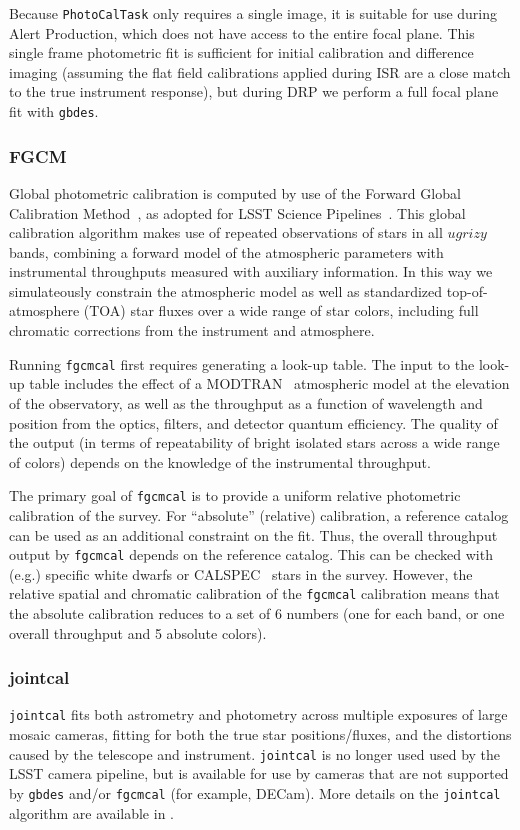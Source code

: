 Because \texttt{PhotoCalTask} only requires a single image, it is suitable for use during Alert Production, which does not have access to the entire focal plane.
This single frame photometric fit is sufficient for initial calibration and difference imaging (assuming the flat field calibrations applied during ISR are a close match to the true instrument response), but during DRP we perform a full focal plane fit with \texttt{gbdes}.

\subsubsection{FGCM}
\label{sec:fgcmcal}

Global photometric calibration is computed by use of the Forward Global Calibration Method~\citep[FGCM][]{2018AJ....155...41B}, as adopted for LSST Science Pipelines~\citep{SITCOMTN-086}.
This global calibration algorithm makes use of repeated observations of stars in all $ugrizy$ bands, combining a forward model of the atmospheric parameters with instrumental throughputs measured with auxiliary information.
In this way we simulateously constrain the atmospheric model as well as standardized top-of-atmosphere (TOA) star fluxes over a wide range of star colors, including full chromatic corrections from the instrument and atmosphere.

Running \texttt{fgcmcal} first requires generating a look-up table.
The input to the look-up table includes the effect of a MODTRAN~\citep{10.1117/12.366388} atmospheric model at the elevation of the observatory, as well as the throughput as a function of wavelength and position from the optics, filters, and detector quantum efficiency.
The quality of the output (in terms of repeatability of bright isolated stars across a wide range of colors) depends on the knowledge of the instrumental throughput.

The primary goal of \texttt{fgcmcal} is to provide a uniform relative photometric calibration of the survey.
For ``absolute'' (relative) calibration, a reference catalog can be used as an additional constraint on the fit.
Thus, the overall throughput output by \texttt{fgcmcal} depends on the reference catalog.
This can be checked with (e.g.) specific white dwarfs or CALSPEC~\citep{2007ASPC..364..315B} stars in the survey.
However, the relative spatial and chromatic calibration of the \texttt{fgcmcal} calibration means that the absolute calibration reduces to a set of 6 numbers (one for each band, or one overall throughput and 5 absolute colors).

\subsubsection{jointcal}
\label{sec:jointcal}

\texttt{jointcal} fits both astrometry and photometry across multiple exposures of large mosaic cameras, fitting for both the true star positions/fluxes, and the distortions caused by the telescope and instrument.
\texttt{jointcal} is no longer used used by the LSST camera pipeline, but is available for use by cameras that are not supported by \texttt{gbdes} and/or \texttt{fgcmcal} (for example, DECam).
More details on the \texttt{jointcal} algorithm are available in \citep{DMTN-036}.
